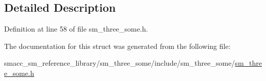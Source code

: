\subsection{Detailed Description}


Definition at line 58 of file sm\+\_\+three\+\_\+some.\+h.



The documentation for this struct was generated from the following file\+:\begin{DoxyCompactItemize}
\item 
smacc\+\_\+sm\+\_\+reference\+\_\+library/sm\+\_\+three\+\_\+some/include/sm\+\_\+three\+\_\+some/\hyperlink{sm__three__some_8h}{sm\+\_\+three\+\_\+some.\+h}\end{DoxyCompactItemize}
